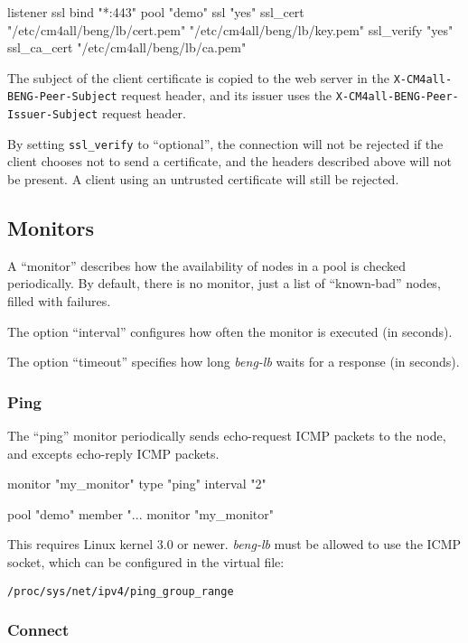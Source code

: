 \documentclass[a4paper,12pt]{article}
\begin{document}
\begin{verbatim*}
listener ssl {
  bind "*:443"
  pool "demo"
  ssl "yes"
  ssl_cert "/etc/cm4all/beng/lb/cert.pem" "/etc/cm4all/beng/lb/key.pem"
  ssl_verify "yes"
  ssl_ca_cert "/etc/cm4all/beng/lb/ca.pem"
}
\end{verbatim*}

The subject of the client certificate is copied to the web server in
the \verb|X-CM4all-BENG-Peer-Subject| request header, and its issuer
uses the \verb|X-CM4all-BENG-Peer-Issuer-Subject| request header.

By setting \verb|ssl_verify| to ``optional'', the connection will not
be rejected if the client chooses not to send a certificate, and the
headers described above will not be present.  A client using an
untrusted certificate will still be rejected.

\subsection{Monitors}

A ``monitor'' describes how the availability of nodes in a pool is
checked periodically.  By default, there is no monitor, just a list of
``known-bad'' nodes, filled with failures.

The option ``interval'' configures how often the monitor is executed
(in seconds).

The option ``timeout'' specifies how long \emph{beng-lb} waits for a
response (in seconds).

\subsubsection{Ping}

The ``ping'' monitor periodically sends echo-request ICMP packets to
the node, and excepts echo-reply ICMP packets.

\begin{verbatim*}
monitor "my_monitor" {
  type "ping"
  interval "2"
}

pool "demo" {
  member "...
  monitor "my_monitor"
}
\end{verbatim*}

This requires Linux kernel 3.0 or newer.  \emph{beng-lb} must be
allowed to use the ICMP socket, which can be configured in the virtual
file:

\texttt{/proc/sys/net/ipv4/ping\_group\_range}

\subsubsection{Connect}
\end{document}
